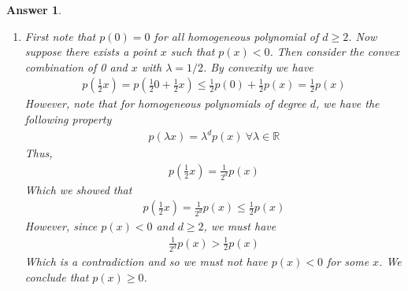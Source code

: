 \documentclass[12pt]{article}
\theoremstyle{colon}
\newtheorem*{answer}{Answer}
\begin{document}
\begin{answer}
\begin{enumerate}[label=\roman*)]
    \item First note that $p(0) = 0$ for all homogeneous polynomial of $d \geq 2$. Now suppose there exists a point $x$ such that $p(x) < 0$. Then consider the convex combination of 0 and $x$ with $\lambda = 1/2$. By convexity we have
      \begin{gather*}
        p(\frac{1}{2} x) = p(\frac{1}{2}0 + \frac{1}{2}x) \leq \frac{1}{2} p(0) + \frac{1}{2} p(x) = \frac{1}{2} p(x)
      \end{gather*}
      However, note that for homogeneous polynomials of degree $d$, we have the following property
      \begin{gather*}
        p(\lambda x) = \lambda^d p(x) \ \forall \lambda \in \mathbb{R}
      \end{gather*}
      Thus,
      \begin{gather*}
        p(\frac{1}{2} x) = \frac{1}{2^d} p(x)
      \end{gather*}
      Which we showed that
      \begin{gather*}
        p(\frac{1}{2} x) = \frac{1}{2^d} p(x) \leq \frac{1}{2} p(x)
      \end{gather*}
      However, since $p(x) < 0$ and $d \geq 2$, we must have
      \begin{gather*}
        \frac{1}{2^d} p(x) > \frac{1}{2} p(x)
      \end{gather*}
      Which is a contradiction and so we must not have $p(x) < 0$ for some $x$. We conclude that $p(x) \geq 0$.


\end{enumerate}
\end{answer}
\end{document}
